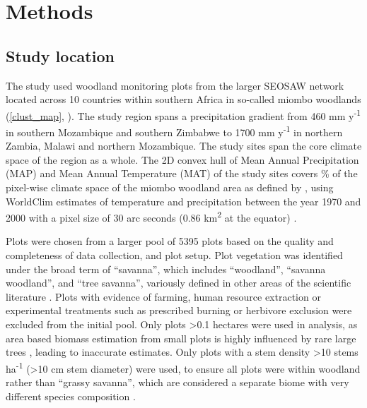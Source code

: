 \documentclass[11pt,a4paper]{article}
\begin{document}

\section{Methods}

\subsection{Study location}

The study used \nplots{} woodland monitoring plots from the larger SEOSAW network \citep{seosaw_web} located across 10 countries within southern Africa in so-called miombo woodlands (\autoref{clust_map}, \citealt{White1987}). The study region spans a precipitation gradient from \textapprox{}460 mm y\textsuperscript{-1} in southern Mozambique and southern Zimbabwe to \textapprox{}1700 mm y\textsuperscript{-1} in northern Zambia, Malawi and northern Mozambique. The study sites span the core climate space of the region as a whole. The 2D convex hull of Mean Annual Precipitation (MAP) and Mean Annual Temperature (MAT) of the study sites covers \hullcover{}\% of the pixel-wise climate space of the miombo woodland area as defined by \citet{White1987}, using WorldClim estimates of temperature and precipitation between the year 1970 and 2000 with a pixel size of 30 arc seconds (0.86 km\textsuperscript{2} at the equator) \citep{Fick2017}. 

Plots were chosen from a larger pool of 5395 plots based on the quality and completeness of data collection, and plot setup. Plot vegetation was identified under the broad term of ``savanna'', which includes ``woodland'', ``savanna woodland'', and ``tree savanna'', variously defined in other areas of the scientific literature \citep{Ratnam2011, Hill2010}. Plots with evidence of farming, human resource extraction or experimental treatments such as prescribed burning or herbivore exclusion were excluded from the initial pool. Only plots >0.1 hectares were used in analysis, as area based biomass estimation from small plots is highly influenced by rare large trees \citep{Stegen2011}, leading to inaccurate estimates. Only plots with a stem density >10 stems ha\textsuperscript{-1} (>10 cm stem diameter) were used, to ensure all plots were within woodland rather than ``grassy savanna'', which are considered a separate biome with very different species composition \citep{Parr2014}. 
\end{document}
